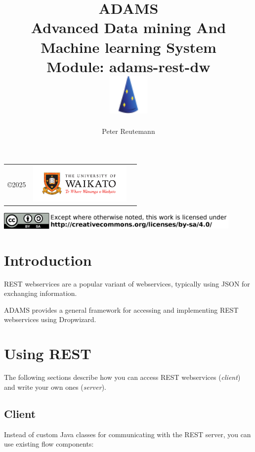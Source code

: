 \documentclass[a4paper]{book}
\title{
  \textbf{ADAMS} \\
  {\Large \textbf{A}dvanced \textbf{D}ata mining \textbf{A}nd \textbf{M}achine
  learning \textbf{S}ystem} \\
  {\Large Module: adams-rest-dw} \\
  \vspace{1cm}
  \includegraphics[width=2cm]{images/rest-dw-module.png} \\
}
\author{
  Peter Reutemann
}
\begin{document}
\begin{titlepage}
\maketitle

\thispagestyle{empty}
\center
\begin{table}[b]
	\begin{tabular}{c l l}
		\parbox[c][2cm]{2cm}{\copyright 2025} &
		\parbox[c][2cm]{5cm}{\includegraphics[width=5cm]{images/coat_of_arms.pdf}} \\
	\end{tabular}
	\includegraphics[width=12cm]{images/cc.png} \\
\end{table}

\end{titlepage}

\tableofcontents

\chapter{Introduction}
REST webservices\cite{rest} are a popular variant of webservices, typically using
JSON for exchanging information.

ADAMS provides a general framework for accessing and implementing REST webservices
using Dropwizard\cite{dropwizard}.

\chapter{Using REST}
The following sections describe how you can access REST webservices (\textit{client})
and write your own ones (\textit{server}).

\section{Client}
Instead of custom Java classes for communicating with the REST server, you can use
existing flow components:
\end{document}
